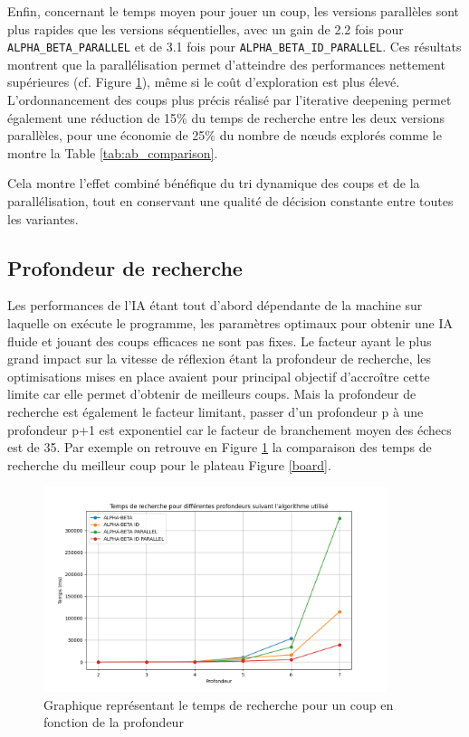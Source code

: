 \documentclass{article}
\begin{document}
Enfin, concernant le temps moyen pour jouer un coup, les versions parallèles sont plus rapides que les versions séquentielles, avec un gain de 2.2 fois pour \texttt{ALPHA\_BETA\_PARALLEL} et de 3.1 fois pour \texttt{ALPHA\_BETA\_ID\_PARALLEL}. Ces résultats montrent que la parallélisation permet d'atteindre des performances nettement supérieures (cf. Figure \ref{plot}), même si le coût d'exploration est plus élevé.
L'ordonnancement des coups plus précis réalisé par l'iterative deepening permet également une réduction de 15\% du temps de recherche entre les deux versions parallèles, pour une économie de 25\% du nombre de nœuds explorés comme le montre la Table \ref{tab:ab_comparison}.

Cela montre l'effet combiné bénéfique du tri dynamique des coups et de la parallélisation, tout en conservant une qualité de décision constante entre toutes les variantes.


\subsection{Profondeur de recherche}

Les performances de l'IA étant tout d'abord dépendante de la machine sur laquelle on exécute le programme, les paramètres optimaux pour obtenir une IA fluide et jouant des coups efficaces 
ne sont pas fixes. Le facteur ayant le plus grand impact sur la vitesse de réflexion étant la profondeur de recherche, les optimisations mises en place avaient pour principal objectif d'accroître
cette limite car elle permet d'obtenir de meilleurs coups. Mais la profondeur de recherche est également le facteur limitant, passer d'un profondeur p à une profondeur p+1 est exponentiel car le facteur
de branchement moyen des échecs est de 35. Par exemple on retrouve en Figure \ref{plot} la comparaison des temps de recherche du meilleur coup pour le plateau Figure \ref{board}.

\begin{figure}[h]
    \centering
    \includegraphics[width=\textwidth,height=6.0cm,keepaspectratio]{plot_depth.png}
    \caption{Graphique représentant le temps de recherche pour un coup en fonction de la profondeur}
    \label{plot}
\end{figure}
\end{document}
